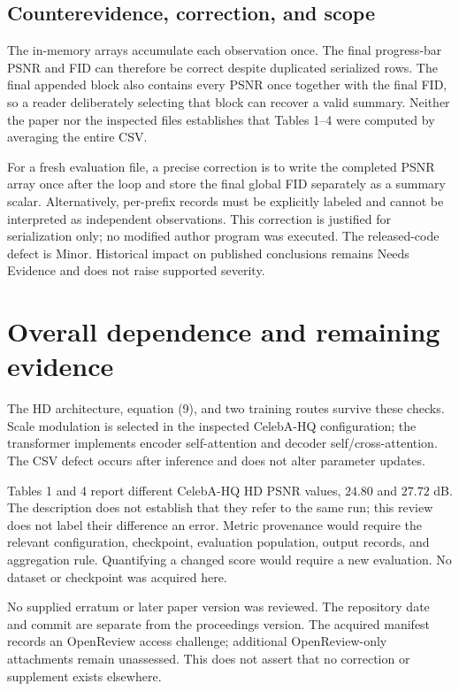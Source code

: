 \documentclass[10pt]{article}
\begin{document}
\subsection*{Counterevidence, correction, and scope}
The in-memory arrays accumulate each observation once. The final progress-bar PSNR and FID can therefore be correct despite duplicated serialized rows. The final appended block also contains every PSNR once together with the final FID, so a reader deliberately selecting that block can recover a valid summary. Neither the paper nor the inspected files establishes that Tables 1–4 were computed by averaging the entire CSV.\par
For a fresh evaluation file, a precise correction is to write the completed PSNR array once after the loop and store the final global FID separately as a summary scalar. Alternatively, per-prefix records must be explicitly labeled and cannot be interpreted as independent observations. This correction is justified for serialization only; no modified author program was executed. The released-code defect is Minor. Historical impact on published conclusions remains Needs Evidence and does not raise supported severity.\par
\section*{Overall dependence and remaining evidence}
The HD architecture, equation (9), and two training routes survive these checks. Scale modulation is selected in the inspected CelebA-HQ configuration; the transformer implements encoder self-attention and decoder self/cross-attention. The CSV defect occurs after inference and does not alter parameter updates.\par
Tables 1 and 4 report different CelebA-HQ HD PSNR values, \(24.80\) and \(27.72\) dB. The description does not establish that they refer to the same run; this review does not label their difference an error. Metric provenance would require the relevant configuration, checkpoint, evaluation population, output records, and aggregation rule. Quantifying a changed score would require a new evaluation. No dataset or checkpoint was acquired here.\par
No supplied erratum or later paper version was reviewed. The repository date and commit are separate from the proceedings version. The acquired manifest records an OpenReview access challenge; additional OpenReview-only attachments remain unassessed. This does not assert that no correction or supplement exists elsewhere.\par
\end{document}
